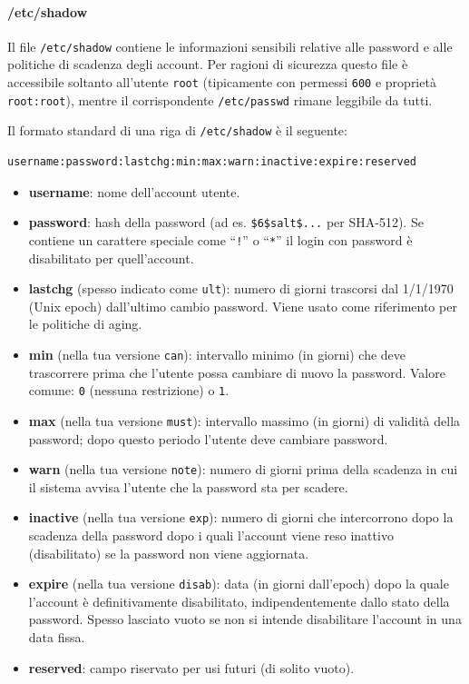 \paragraph{/etc/shadow}
Il file \texttt{/etc/shadow} contiene le informazioni sensibili relative alle password e alle politiche di scadenza degli account.
Per ragioni di sicurezza questo file è accessibile soltanto all'utente \texttt{root} (tipicamente con permessi \texttt{600} e proprietà \texttt{root:root}), mentre il corrispondente \texttt{/etc/passwd} rimane leggibile da tutti.

Il formato standard di una riga di \texttt{/etc/shadow} è il seguente:
\begin{verbatim}
username:password:lastchg:min:max:warn:inactive:expire:reserved
\end{verbatim}

\begin{itemize}
  \item \textbf{username}: nome dell'account utente.
  \item \textbf{password}: hash della password (ad es. \texttt{\$6\$salt\$...} per SHA-512). Se contiene un carattere speciale come ``\texttt{!}'' o ``\texttt{*}'' il login con password è disabilitato per quell'account.
  \item \textbf{lastchg} (spesso indicato come \texttt{ult}): numero di giorni trascorsi dal 1/1/1970 (Unix epoch) dall'ultimo cambio password. Viene usato come riferimento per le politiche di aging.
  \item \textbf{min} (nella tua versione \texttt{can}): intervallo minimo (in giorni) che deve trascorrere prima che l'utente possa cambiare di nuovo la password. Valore comune: \texttt{0} (nessuna restrizione) o \texttt{1}.
  \item \textbf{max} (nella tua versione \texttt{must}): intervallo massimo (in giorni) di validità della password; dopo questo periodo l'utente deve cambiare password.
  \item \textbf{warn} (nella tua versione \texttt{note}): numero di giorni prima della scadenza in cui il sistema avvisa l'utente che la password sta per scadere.
  \item \textbf{inactive} (nella tua versione \texttt{exp}): numero di giorni che intercorrono dopo la scadenza della password dopo i quali l'account viene reso inattivo (disabilitato) se la password non viene aggiornata.
  \item \textbf{expire} (nella tua versione \texttt{disab}): data (in giorni dall'epoch) dopo la quale l'account è definitivamente disabilitato, indipendentemente dallo stato della password. Spesso lasciato vuoto se non si intende disabilitare l'account in una data fissa.
  \item \textbf{reserved}: campo riservato per usi futuri (di solito vuoto).
\end{itemize}

